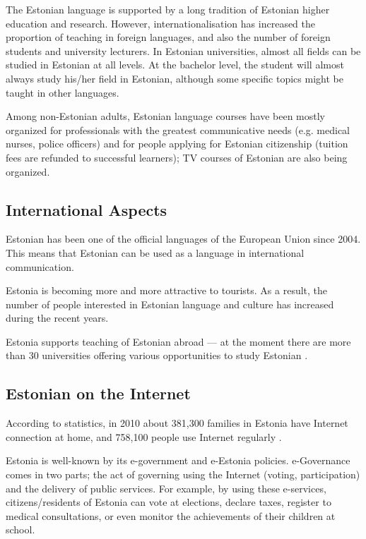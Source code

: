 \begin{multicols}{2}

The Estonian language is supported by a long tradition of Estonian higher education and research. 
However, internationalisation has increased the proportion of teaching in foreign languages, and also the number of foreign students and university lecturers. 
In Estonian universities, almost all ﬁelds can be studied in Estonian at all levels. 
At the bachelor level, the student will almost always study his/her ﬁeld in Estonian, although some speciﬁc topics might be taught in other languages.

Among non-Estonian adults, Estonian language courses have been mostly organized for professionals with the greatest communicative needs (e.g. medical nurses, police officers) and for people applying for Estonian citizenship (tuition fees are refunded to successful learners); TV courses of Estonian are also being organized.
 

\subsection{International Aspects}

Estonian has been one of the official languages of the European Union since 2004. 
This means that Estonian can be used as a language in international communication.
 
Estonia is becoming more and more attractive to tourists. 
As a result, the number of people interested in Estonian language and culture has increased during the recent years.

Estonia supports teaching of Estonian abroad --- at the moment there are more than 30 universities offering various opportunities to study Estonian \cite{EstInst}.
 
\subsection{Estonian on the Internet}

According to statistics, in 2010 about 381,300 families in Estonia have Internet connection at home, and 758,100 people use Internet regularly \cite{Stat3}. 


Estonia is well-known by its e-government and e-Estonia policies. 
e-Governance comes in two parts; the act of governing using the Internet (voting, participation) and the delivery of public services. 
For example, by using these e-services, citizens/residents of Estonia can vote at elections, declare taxes, register to medical consultations, or even monitor the achievements of their children at school. 




\end{multicols}
